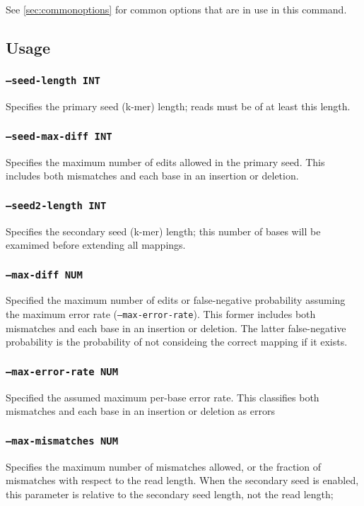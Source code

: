 \documentclass[a4paper,12pt]{book}
\newcommand{\TT}[1]{{\tt #1}} %
\begin{document}
See \autoref{sec:commonoptions} for common options that are in use in this command.

\subsection{Usage}

\subsubsection{\TT{--seed-length INT}}
Specifies the primary seed (k-mer) length; reads must be of at least this length.

\subsubsection{\TT{--seed-max-diff INT}}
Specifies the maximum number of edits allowed in the primary seed.
This includes both mismatches and each base in an insertion or deletion. 

\subsubsection{\TT{--seed2-length INT}}
Specifies the secondary seed (k-mer) length; this number of bases will be examimed before extending all mappings.

\subsubsection{\TT{--max-diff NUM}}
Specified the maximum number of edits or false-negative probability assuming the maximum error rate (\TT{--max-error-rate}).
This former includes both mismatches and each base in an insertion or deletion. 
The latter false-negative probability is the probability of not consideing the correct mapping if it exists. 

\subsubsection{\TT{--max-error-rate NUM}}
Specified the assumed maximum per-base error rate.
This classifies both mismatches and each base in an insertion or deletion as errors 

\subsubsection{\TT{--max-mismatches NUM}}
Specifies the maximum number of mismatches allowed, or the fraction of mismatches with respect to the read length.
When the secondary seed is enabled, this parameter is relative to the secondary seed length, not the read length;
\end{document}

